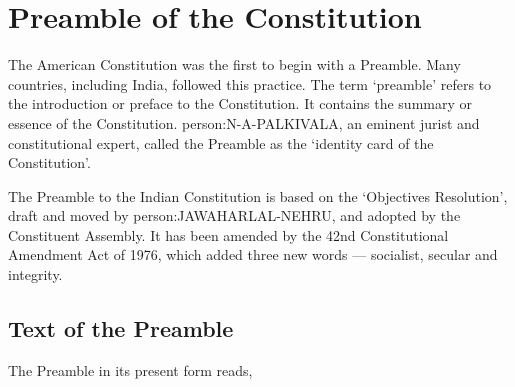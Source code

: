 \chapter{Preamble of the Constitution}

\begin{multicol}{2}

The American Constitution was the first to begin with a Preamble. Many countries, including India, followed this practice. The term `preamble' refers to the introduction or preface to the Constitution. It contains the summary or essence of the Constitution. \gls{person:N-A-PALKIVALA}, an eminent jurist and constitutional expert, called the Preamble as the `identity card of the Constitution'.

The Preamble to the Indian Constitution is based on the `Objectives Resolution', draft and moved by \gls{person:JAWAHARLAL-NEHRU}, and adopted by the Constituent Assembly. It has been amended by the 42nd Constitutional Amendment Act of 1976, which added three new words — socialist, secular and integrity.

\section{Text of the Preamble}

The Preamble in its present form reads,



\end{multicol}
